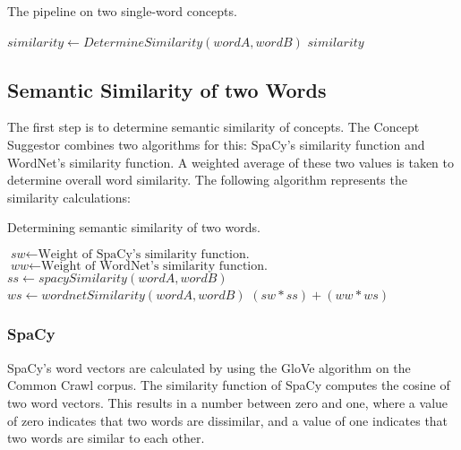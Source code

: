 \documentclass{article}
\begin{document}
\begin{algorithm}
\caption{The pipeline on two single-word concepts.}\label{al:twowordpipeline}
\begin{algorithmic}[1]
		\State $\textit{similarity} \gets \textit{DetermineSimilarity}(wordA, wordB)$
				\State {}
			\EndIf
		\EndIf
		\State \Return $\textit{similarity}$
	\EndProcedure
\end{algorithmic}
\end{algorithm}


\subsection{Semantic Similarity of two Words}

The first step is to determine semantic similarity of concepts. The Concept Suggestor combines two algorithms for this: SpaCy's similarity function and WordNet's similarity function. A weighted average of these two values is taken to determine overall word similarity. The following algorithm represents the similarity calculations: %
\begin{algorithm}
\caption{Determining semantic similarity of two words.}\label{al:semanticsimilarity}
\begin{algorithmic}[1]
		\State $\textit{sw} \gets \text{Weight of SpaCy's similarity function.}$
		\State $\textit{ww} \gets \text{Weight of WordNet's similarity function.}$
		\State $\textit{ss} \gets \textit{spacySimilarity}(wordA, wordB)$
		\State $\textit{ws} \gets \textit{wordnetSimilarity}(wordA, wordB)$
		\State \Return $(sw*ss)+(ww*ws)$
	\EndProcedure
\end{algorithmic}
\end{algorithm}

\subsubsection{SpaCy}
SpaCy's word vectors are calculated by using the GloVe algorithm on the Common Crawl corpus. The similarity function of SpaCy computes the cosine of two word vectors. This results in a number between zero and one, where a value of zero indicates that two words are dissimilar, and a value of one indicates that two words are similar to each other. %
\end{document}
